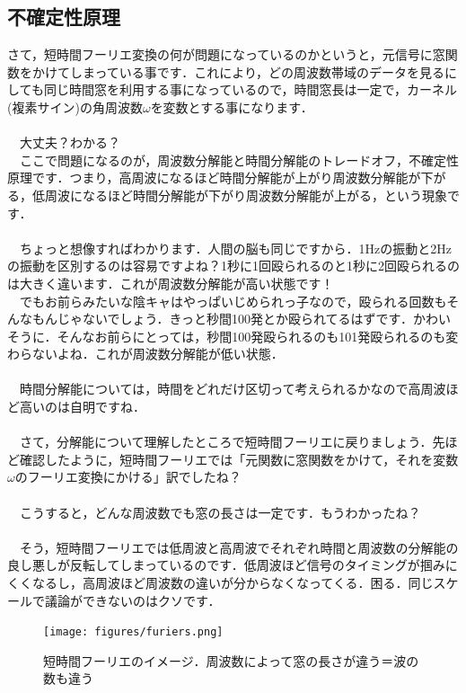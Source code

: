 \documentclass[11pt,a4paper,uplatex]{ujreport} 	%
\begin{document}
\subsection{不確定性原理}
さて，短時間フーリエ変換の何が問題になっているのかというと，元信号に窓関数をかけてしまっている事です．これにより，どの周波数帯域のデータを見るにしても同じ時間窓を利用する事になっているので，時間窓長は一定で，カーネル(複素サイン)の角周波数$\omega$を変数とする事になります．\\
\\
　大丈夫？わかる？
\\
　ここで問題になるのが，周波数分解能と時間分解能のトレードオフ，不確定性原理です．つまり，高周波になるほど時間分解能が上がり周波数分解能が下がる，低周波になるほど時間分解能が下がり周波数分解能が上がる，という現象です．\\
\\
　ちょっと想像すればわかります．人間の脳も同じですから．1Hzの振動と2Hzの振動を区別するのは容易ですよね？1秒に1回殴られるのと1秒に2回殴られるのは大きく違います．これが周波数分解能が高い状態です！\\
　でもお前らみたいな陰キャはやっぱいじめられっ子なので，殴られる回数もそんなもんじゃないでしょう．きっと秒間100発とか殴られてるはずです．かわいそうに．そんなお前らにとっては，秒間100発殴られるのも101発殴られるのも変わらないよね．これが周波数分解能が低い状態．\\
\\
　時間分解能については，時間をどれだけ区切って考えられるかなので高周波ほど高いのは自明ですね．\\
\\
　さて，分解能について理解したところで短時間フーリエに戻りましょう．先ほど確認したように，短時間フーリエでは「元関数に窓関数をかけて，それを変数$\omega$のフーリエ変換にかける」訳でしたね？\\
\\
　こうすると，どんな周波数でも窓の長さは一定です．もうわかったね？\\
\\
　そう，短時間フーリエでは低周波と高周波でそれぞれ時間と周波数の分解能の良し悪しが反転してしまっているのです．低周波ほど信号のタイミングが掴みにくくなるし，高周波ほど周波数の違いが分からなくなってくる．困る．同じスケールで議論ができないのはクソです．

\begin{figure}[H]
\label{im:furiers}
  \centering
  \texttt{[image: figures/furiers.png]}
  \caption{短時間フーリエのイメージ．周波数によって窓の長さが違う＝波の数も違う}
\end{figure}
\end{document}

